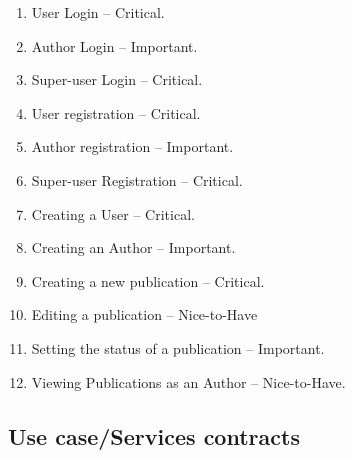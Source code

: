 \documentclass{article} %
\begin{document}
	
		\begin{enumerate}
	
		\item  User Login -- Critical.

		\item  Author Login -- Important.
		
		\item  Super-user Login -- Critical.
		
		\item  User registration -- Critical.
		
		\item  Author registration -- Important.
		
		\item  Super-user Registration -- Critical.
		
		\item  Creating a User -- Critical.
		
		\item  Creating an Author -- Important.
		
		\item  Creating a new publication -- Critical.
		
		\item  Editing a publication -- Nice-to-Have
		
		\item  Setting the status of a publication -- Important.
		
		\item  Viewing Publications as an Author -- Nice-to-Have.
	\end{enumerate}
	
	\noindent 
	
	
	\subsection{ Use case/Services contracts}
	
\end{document}
